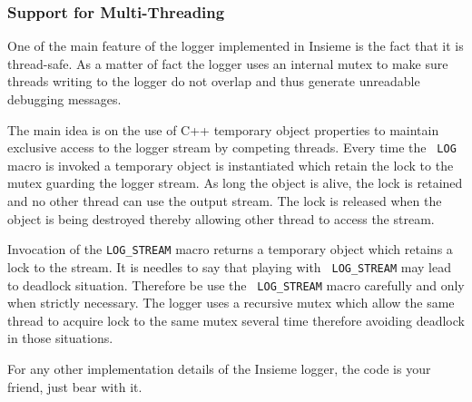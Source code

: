 \subsubsection{Support for Multi-Threading}

One of the main feature of the logger implemented in Insieme is the fact that it
is thread-safe. As a matter of fact the logger uses an internal mutex to make
sure threads writing to the logger do not overlap and thus generate unreadable
debugging messages. 

The main idea is on the use of C++ temporary object properties to maintain
exclusive access to the logger stream by competing threads. Every time the {\tt
LOG} macro is invoked a temporary object is instantiated which retain the lock
to the mutex guarding the logger stream. As long the object is alive, the lock
is retained and no other thread can use the output stream. The lock is released
when the object is being destroyed thereby allowing other thread to access the
stream. 

Invocation of the {\tt LOG\_STREAM} macro returns a temporary object which
retains a lock to the stream. It is needles to say that playing with {\tt
LOG\_STREAM} may lead to deadlock situation. Therefore be use the {\tt
LOG\_STREAM} macro carefully and only when strictly necessary. The logger uses a
recursive mutex which allow the same thread to acquire lock to the same mutex
several time therefore avoiding deadlock in those situations. 

For any other implementation details of the Insieme logger, the code is your
friend, just bear with it.
 

